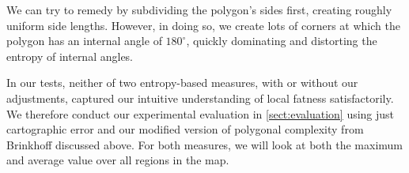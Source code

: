 We can try to remedy by subdividing the polygon's sides first, creating roughly uniform side lengths.
However, in doing so, we create lots of corners at which the polygon has an internal angle of $180^\circ$, quickly dominating and distorting the entropy of internal angles.

In our tests, neither of two entropy-based measures, with or without our adjustments, captured our intuitive understanding of local fatness satisfactorily.
We therefore conduct our experimental evaluation in \cref{sect:evaluation} using just cartographic error and our modified version of polygonal complexity from Brinkhoff \etal{} \cite{brinkhoff1995measuring} discussed above.
For both measures, we will look at both the maximum and average value over all regions in the map.
